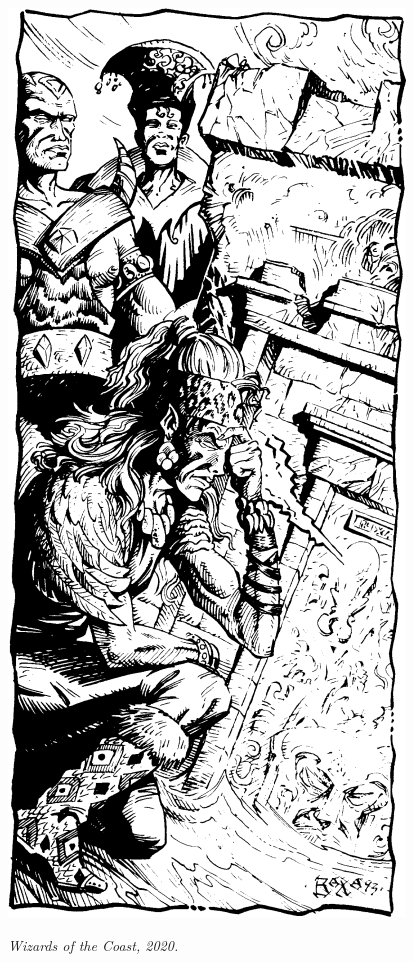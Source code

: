 \begin{figure}[b!]
\centering
\includegraphics[width=\columnwidth-6mm]{images/cleric-4.png}
\par\textit{\small\textcopyright Wizards of the Coast, 2020.}
\end{figure}

